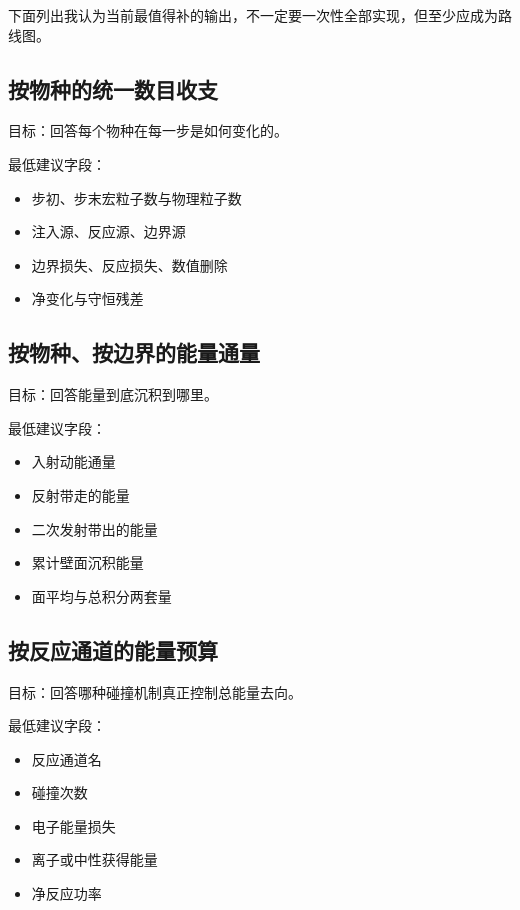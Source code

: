 \documentclass[11pt,a4paper]{ctexart}
\begin{document}
下面列出我认为当前最值得补的输出，不一定要一次性全部实现，但至少应成为路线图。

\subsection{按物种的统一数目收支}

目标：回答每个物种在每一步是如何变化的。

最低建议字段：

\begin{itemize}
  \item 步初、步末宏粒子数与物理粒子数
  \item 注入源、反应源、边界源
  \item 边界损失、反应损失、数值删除
  \item 净变化与守恒残差
\end{itemize}

\subsection{按物种、按边界的能量通量}

目标：回答能量到底沉积到哪里。

最低建议字段：

\begin{itemize}
  \item 入射动能通量
  \item 反射带走的能量
  \item 二次发射带出的能量
  \item 累计壁面沉积能量
  \item 面平均与总积分两套量
\end{itemize}

\subsection{按反应通道的能量预算}

目标：回答哪种碰撞机制真正控制总能量去向。

最低建议字段：

\begin{itemize}
  \item 反应通道名
  \item 碰撞次数
  \item 电子能量损失
  \item 离子或中性获得能量
  \item 净反应功率
\end{itemize}
\end{document}
